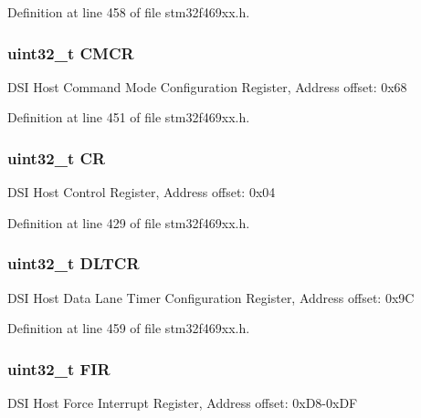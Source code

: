 Definition at line 458 of file stm32f469xx.\+h.

\subsubsection[{\texorpdfstring{C\+M\+CR}{CMCR}}]{ uint32\+\_\+t C\+M\+CR}\hypertarget{struct_d_s_i___type_def_a28425c08d0f99dc282950144e02c084e}{}\label{struct_d_s_i___type_def_a28425c08d0f99dc282950144e02c084e}
D\+SI Host Command Mode Configuration Register, Address offset\+: 0x68 

Definition at line 451 of file stm32f469xx.\+h.

\subsubsection[{\texorpdfstring{CR}{CR}}]{ uint32\+\_\+t CR}\hypertarget{struct_d_s_i___type_def_ab40c89c59391aaa9d9a8ec011dd0907a}{}\label{struct_d_s_i___type_def_ab40c89c59391aaa9d9a8ec011dd0907a}
D\+SI Host Control Register, Address offset\+: 0x04 

Definition at line 429 of file stm32f469xx.\+h.

\subsubsection[{\texorpdfstring{D\+L\+T\+CR}{DLTCR}}]{ uint32\+\_\+t D\+L\+T\+CR}\hypertarget{struct_d_s_i___type_def_abb5694635b72d5bf5ef25023070492b3}{}\label{struct_d_s_i___type_def_abb5694635b72d5bf5ef25023070492b3}
D\+SI Host Data Lane Timer Configuration Register, Address offset\+: 0x9C 

Definition at line 459 of file stm32f469xx.\+h.

\subsubsection[{\texorpdfstring{F\+IR}{FIR}}]{ uint32\+\_\+t F\+IR}\hypertarget{struct_d_s_i___type_def_a056bece8ebbb0b4022d6166f59698ca2}{}\label{struct_d_s_i___type_def_a056bece8ebbb0b4022d6166f59698ca2}
D\+SI Host Force Interrupt Register, Address offset\+: 0x\+D8-\/0x\+DF 

